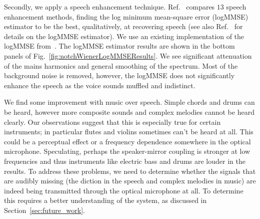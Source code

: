 \documentclass[paper-main.tex]{subfiles}
\begin{document}
Secondly, we apply a speech enhancement technique. 
Ref.~\cite{SubjectiveComparison} compares $13$ speech enhancement methods, finding the log minimum mean-square error (logMMSE) estimator to be the best, qualitatively, at recovering speech (see also Ref.~\cite{Ephraim1984SpeechEU_logMMSE} for details on the logMMSE estimator). 
We use an existing implementation of the logMMSE from~\cite{logmmse}.  
The logMMSE estimator results are shown in the bottom panels of Fig.~\ref{fig:notchWienerLogMMSEResults}. 
We see significant attenuation of the mains harmonics and general smoothing of the spectrum. 
Most of the background noise is removed, however, the logMMSE does not significantly enhance the speech as the voice sounds muffled and indistinct.


We find some improvement with music over speech. 
Simple chords and drums can be heard, however more composite sounds and complex melodies cannot be heard clearly. 
Our observations suggest that this is especially true for certain instruments; in particular flutes and violins sometimes can’t be heard at all. 
This could be a perceptual effect or a frequency dependence somewhere in the optical microphone.
Speculating, perhaps the speaker-mirror coupling is stronger at low frequencies and thus instruments like electric bass and drums are louder in the results.
To address these problems, we need to determine whether the signals that are audibly missing (the diction in the speech and complex melodies in music) are indeed being transmitted through the optical microphone at all. 
To determine this requires a better understanding of the system, as discussed in Section~\ref{sec:future_work}.
\end{document}
